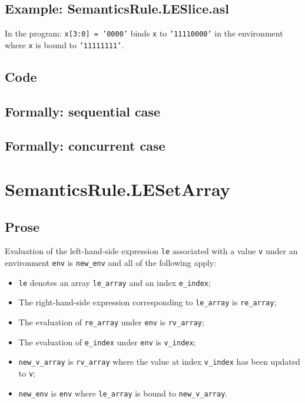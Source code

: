 \documentclass{book}
\begin{document}
   \subsection{Example: SemanticsRule.LESlice.asl}
   In the program:
   \texttt{x[3:0] = '0000'} binds \texttt{x} to \texttt{'11110000'} in the environment where \texttt{x} is bound to \texttt{'11111111'}.

  \subsection{Code}

\begin{emptyformal}
  \subsection{Formally: sequential case}

  \subsection{Formally: concurrent case}
\end{emptyformal}


\section{SemanticsRule.LESetArray \label{sec:SemanticsRule.LESetArray}}

    \subsection{Prose}
    Evaluation of the left-hand-side expression \texttt{le} associated with a
value \texttt{v} under an environment \texttt{env} is \texttt{new\_env} and all
of the following apply:
    \begin{itemize}
    \item \texttt{le} denotes an array \texttt{le\_array} and an index \texttt{e\_index};
    \item The right-hand-side expression corresponding to \texttt{le\_array} is \texttt{re\_array};
    \item The evaluation of \texttt{re\_array} under \texttt{env} is \texttt{rv\_array};
    \item The evaluation of \texttt{e\_index} under \texttt{env} is \texttt{v\_index};
    \item \texttt{new\_v\_array} is \texttt{rv\_array} where the value at index \texttt{v\_index} has been
      updated to \texttt{v};
    \item \texttt{new\_env} is \texttt{env} where \texttt{le\_array} is bound to
      \texttt{new\_v\_array}.
    \end{itemize}
\end{document}
